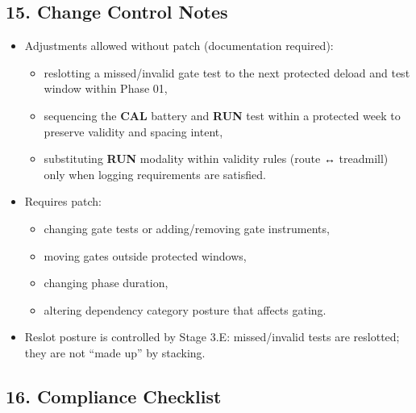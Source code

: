 \documentclass[10pt]{article}
\begin{document}
\subsection*{15. Change Control Notes}

\begin{itemize}
\item Adjustments allowed without patch (documentation required):
\begin{itemize}
\item reslotting a missed/invalid gate test to the next protected deload and test window within Phase 01,
\item sequencing the \textbf{CAL} battery and \textbf{RUN} test within a protected week to preserve validity and spacing intent,
\item substituting \textbf{RUN} modality within validity rules (route ↔ treadmill) only when logging requirements are satisfied.
\end{itemize}
\item Requires patch:
\begin{itemize}
\item changing gate tests or adding/removing gate instruments,
\item moving gates outside protected windows,
\item changing phase duration,
\item altering dependency category posture that affects gating.
\end{itemize}
\item Reslot posture is controlled by Stage 3.E: missed/invalid tests are reslotted; they are not “made up” by stacking.
\end{itemize}

\subsection*{16. Compliance Checklist}
\end{document}
